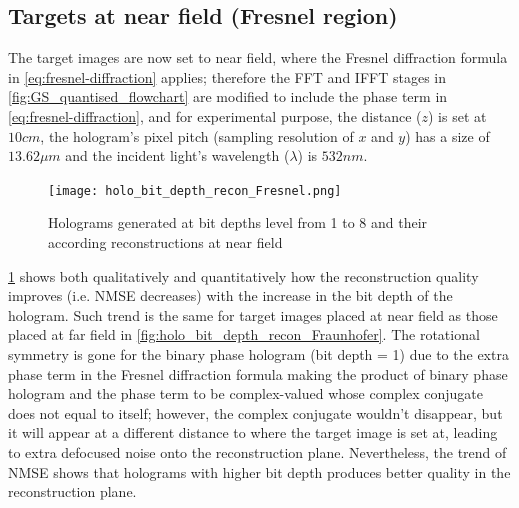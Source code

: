 \subsection{Targets at near field (Fresnel region)}
	The target images are now set to near field, where the Fresnel diffraction formula in \cref{eq:fresnel-diffraction} applies; therefore the FFT and IFFT stages in \cref{fig:GS_quantised_flowchart} are modified to include the phase term in \cref{eq:fresnel-diffraction}, and for experimental purpose, the distance ($z$) is set at $10cm$, the hologram's pixel pitch (sampling resolution of $x$ and $y$) has a size of $13.62\mu m$ and the incident light's wavelength ($\lambda$) is $532nm$.
	\begin{figure} [H]
	   \begin{center}
	   \texttt{[image: holo\_bit\_depth\_recon\_Fresnel.png]}
	   \end{center}
	   \caption{\label{fig:holo_bit_depth_recon_Fresnel} Holograms generated at bit depths level from 1 to 8 and their according reconstructions at near field}
	\end{figure}

	\cref{fig:holo_bit_depth_recon_Fresnel} shows both qualitatively and quantitatively how the reconstruction quality improves (i.e. NMSE decreases) with the increase in the bit depth of the hologram. Such trend is the same for target images placed at near field as those placed at far field in \cref{fig:holo_bit_depth_recon_Fraunhofer}. The rotational symmetry is gone for the binary phase hologram (bit depth = 1) due to the extra phase term in the Fresnel diffraction formula making the product of binary phase hologram and the phase term to be complex-valued whose complex conjugate does not equal to itself; however, the complex conjugate wouldn't disappear, but it will appear at a different distance to where the target image is set at, leading to extra defocused noise onto the reconstruction plane. Nevertheless, the trend of NMSE shows that holograms with higher bit depth produces better quality in the reconstruction plane.

